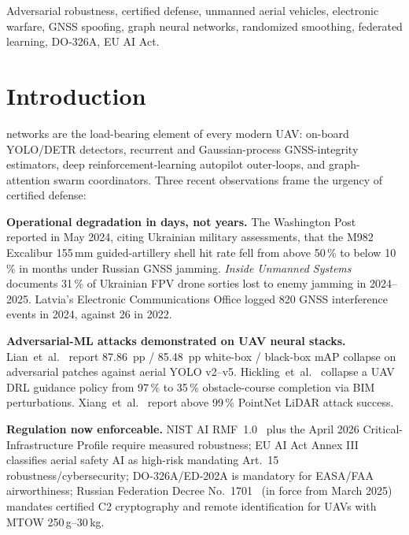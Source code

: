 \documentclass[10pt,journal,compsoc,twoside]{IEEEtran}
\begin{document}
\begin{IEEEkeywords}
Adversarial robustness, certified defense, unmanned aerial vehicles,
electronic warfare, GNSS spoofing, graph neural networks, randomized
smoothing, federated learning, DO-326A, EU AI Act.
\end{IEEEkeywords}

\IEEEpeerreviewmaketitle

\section{Introduction}
\label{sec:intro}

 networks are the load-bearing element of
every modern UAV: on-board YOLO/DETR detectors, recurrent and
Gaussian-process GNSS-integrity estimators, deep reinforcement-learning
autopilot outer-loops, and graph-attention swarm coordinators. Three
recent observations frame the urgency of certified defense:

\textbf{Operational degradation in days, not years.} The Washington
Post~\cite{WaPoExcalibur2024} reported in May 2024, citing Ukrainian
military assessments, that the M982 Excalibur 155\,mm guided-artillery
shell hit rate fell from above 50\,\% to below 10\,\% in months under
Russian GNSS jamming. \textit{Inside Unmanned Systems}~\cite{InsideUAS2025}
documents 31\,\% of Ukrainian FPV drone sorties lost to enemy jamming
in 2024--2025. Latvia's Electronic Communications Office logged
820 GNSS interference events in 2024, against 26 in 2022.

\textbf{Adversarial-ML attacks demonstrated on UAV neural stacks.}
Lian~et~al.~\cite{Lian2022TGRS} report 87.86~pp / 85.48~pp white-box /
black-box mAP collapse on adversarial patches against aerial YOLO
v2--v5. Hickling~et~al.~\cite{Hickling2023TIV} collapse a UAV DRL
guidance policy from 97\,\% to 35\,\% obstacle-course completion via
BIM perturbations. Xiang~et~al.~\cite{Xiang2019CVPR} report above 99\,\%
PointNet LiDAR attack success.

\textbf{Regulation now enforceable.} NIST AI RMF~1.0~\cite{NIST_AI_RMF}
plus the April 2026 Critical-Infrastructure Profile require measured
robustness; EU AI Act Annex III classifies aerial safety AI as high-risk
mandating Art.~15 robustness/cybersecurity; DO-326A/ED-202A is
mandatory for EASA/FAA airworthiness; Russian Federation Decree
No.~1701~\cite{RFDec1701} (in force from March 2025) mandates
certified C2 cryptography and remote identification for UAVs with
MTOW 250\,g--30\,kg.
\end{document}
